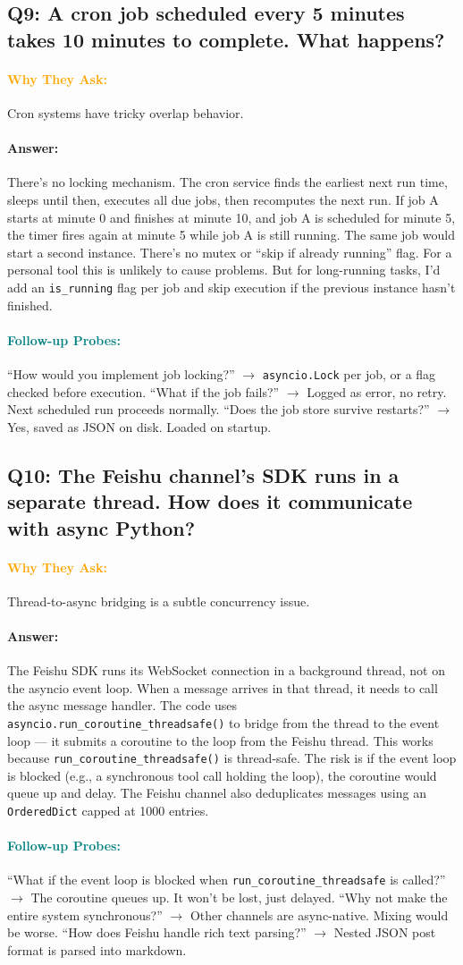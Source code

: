 \documentclass[11pt,a4paper]{article}
\newcommand{\Q}[1]{\subsection{#1}}
\newcommand{\Ans}[1]{\paragraph{\textbf{Answer:}} #1}
\newcommand{\Why}{\paragraph{\textcolor{orange}{\textbf{Why They Ask:}}}}
\newcommand{\Probe}{\paragraph{\textcolor{teal}{\textbf{Follow-up Probes:}}}}
\begin{document}
\Q{Q9: A cron job scheduled every 5 minutes takes 10 minutes to complete. What happens?}
\Why Cron systems have tricky overlap behavior.
\Ans There's no locking mechanism. The cron service finds the earliest next run time, sleeps until then, executes all due jobs, then recomputes the next run. If job A starts at minute 0 and finishes at minute 10, and job A is scheduled for minute 5, the timer fires again at minute 5 while job A is still running. The same job would start a second instance. There's no mutex or ``skip if already running'' flag. For a personal tool this is unlikely to cause problems. But for long-running tasks, I'd add an \texttt{is\_running} flag per job and skip execution if the previous instance hasn't finished.
\Probe ``How would you implement job locking?'' $\rightarrow$ \texttt{asyncio.Lock} per job, or a flag checked before execution. ``What if the job fails?'' $\rightarrow$ Logged as error, no retry. Next scheduled run proceeds normally. ``Does the job store survive restarts?'' $\rightarrow$ Yes, saved as JSON on disk. Loaded on startup.

\Q{Q10: The Feishu channel's SDK runs in a separate thread. How does it communicate with async Python?}
\Why Thread-to-async bridging is a subtle concurrency issue.
\Ans The Feishu SDK runs its WebSocket connection in a background thread, not on the asyncio event loop. When a message arrives in that thread, it needs to call the async message handler. The code uses \texttt{asyncio.run\_coroutine\_threadsafe()} to bridge from the thread to the event loop --- it submits a coroutine to the loop from the Feishu thread. This works because \texttt{run\_coroutine\_threadsafe()} is thread-safe. The risk is if the event loop is blocked (e.g., a synchronous tool call holding the loop), the coroutine would queue up and delay. The Feishu channel also deduplicates messages using an \texttt{OrderedDict} capped at 1000 entries.
\Probe ``What if the event loop is blocked when \texttt{run\_coroutine\_threadsafe} is called?'' $\rightarrow$ The coroutine queues up. It won't be lost, just delayed. ``Why not make the entire system synchronous?'' $\rightarrow$ Other channels are async-native. Mixing would be worse. ``How does Feishu handle rich text parsing?'' $\rightarrow$ Nested JSON post format is parsed into markdown.
\end{document}
